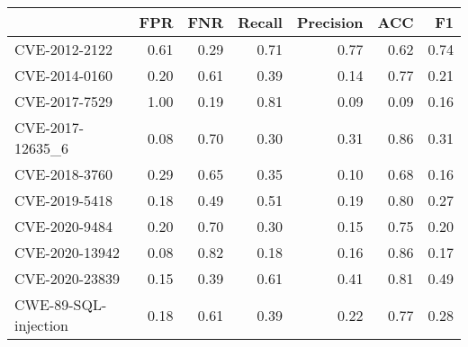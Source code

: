 \begin{tabular}{lrrrrrr}
\toprule
{} &  FPR &  FNR &  Recall &  Precision &  ACC &   F1 \\
\midrule
CVE-2012-2122        & 0.61 & 0.29 &    0.71 &       0.77 & 0.62 & 0.74 \\
CVE-2014-0160        & 0.20 & 0.61 &    0.39 &       0.14 & 0.77 & 0.21 \\
CVE-2017-7529        & 1.00 & 0.19 &    0.81 &       0.09 & 0.09 & 0.16 \\
CVE-2017-12635\_6     & 0.08 & 0.70 &    0.30 &       0.31 & 0.86 & 0.31 \\
CVE-2018-3760        & 0.29 & 0.65 &    0.35 &       0.10 & 0.68 & 0.16 \\
CVE-2019-5418        & 0.18 & 0.49 &    0.51 &       0.19 & 0.80 & 0.27 \\
CVE-2020-9484        & 0.20 & 0.70 &    0.30 &       0.15 & 0.75 & 0.20 \\
CVE-2020-13942       & 0.08 & 0.82 &    0.18 &       0.16 & 0.86 & 0.17 \\
CVE-2020-23839       & 0.15 & 0.39 &    0.61 &       0.41 & 0.81 & 0.49 \\
CWE-89-SQL-injection & 0.18 & 0.61 &    0.39 &       0.22 & 0.77 & 0.28 \\
\bottomrule
\end{tabular}

